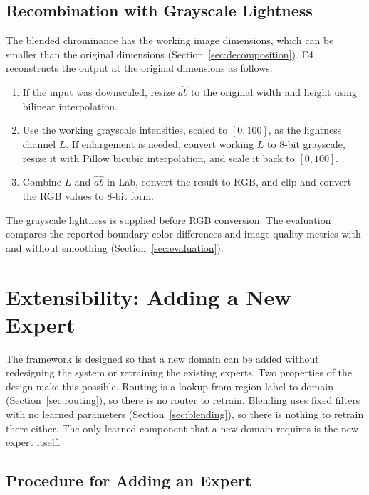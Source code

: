 \documentclass{FastFyp}
\begin{document}
\subsection{Recombination with Grayscale Lightness}

The blended chrominance has the working image dimensions, which can be
smaller than the original dimensions (Section~\ref{sec:decomposition}).
E4 reconstructs the output at the original dimensions as follows.

\begin{enumerate}
    \item If the input was downscaled, resize $\widehat{ab}$ to the
          original width and height using bilinear interpolation.
    \item Use the working grayscale intensities, scaled to $[0,100]$,
          as the lightness channel $L$. If enlargement is needed, convert
          working $L$ to 8-bit grayscale, resize it with Pillow bicubic
          interpolation, and scale it back to $[0,100]$.
    \item Combine $L$ and $\widehat{ab}$ in Lab, convert the result to RGB,
          and clip and convert the RGB values to 8-bit form.
\end{enumerate}

The grayscale lightness is supplied before RGB conversion. The evaluation
compares the reported boundary color differences and image quality metrics
with and without smoothing (Section~\ref{sec:evaluation}).

\section{Extensibility: Adding a New Expert}
\label{sec:extensibility}

The framework is designed so that a new domain can be added without redesigning the system or retraining the existing experts. Two properties of the design make this possible. Routing is a lookup from region label to domain (Section~\ref{sec:routing}), so there is no router to retrain. Blending uses fixed filters with no learned parameters (Section~\ref{sec:blending}), so there is nothing to retrain there either. The only learned component that a new domain requires is the new expert itself.

\subsection{Procedure for Adding an Expert}
\end{document}
